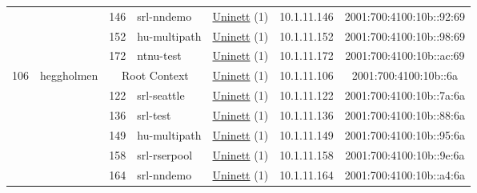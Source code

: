 \begin{small}
\begin{center}
\begin{longtable}{|c|c|c|c|c|c|c|c|}
  &  & \tiny{146} & \multicolumn{1}{|l|}{\tiny{srl-nndemo}} & \multicolumn{2}{|c|}{\tiny{\href{https://www.uninett.no}{Uninett} (1)}} & \tiny{10.1.11.146} & \tiny{2001:700:4100:10b::92:69} \\* \cline{3-3}\cline{4-4}\cline{5-5}\cline{6-6}\cline{7-7}\cline{8-8}
  &  & \tiny{152} & \multicolumn{1}{|l|}{\tiny{hu-multipath}} & \multicolumn{2}{|c|}{\tiny{\href{https://www.uninett.no}{Uninett} (1)}} & \tiny{10.1.11.152} & \tiny{2001:700:4100:10b::98:69} \\* \cline{3-3}\cline{4-4}\cline{5-5}\cline{6-6}\cline{7-7}\cline{8-8}
  &  & \tiny{172} & \multicolumn{1}{|l|}{\tiny{ntnu-test}} & \multicolumn{2}{|c|}{\tiny{\href{https://www.uninett.no}{Uninett} (1)}} & \tiny{10.1.11.172} & \tiny{2001:700:4100:10b::ac:69} \\ \hline
 \multirow{7}{*}{\tiny{106}} & \multicolumn{1}{|l|}{\multirow{7}{*}{\tiny{heggholmen}}} & \multicolumn{2}{|c|}{\tiny{Root Context}} & \multicolumn{2}{|c|}{\tiny{\href{https://www.uninett.no}{Uninett} (1)}} & \tiny{10.1.11.106} & \tiny{2001:700:4100:10b::6a} \\* \cline{3-3}\cline{4-4}\cline{5-5}\cline{6-6}\cline{7-7}\cline{8-8}
  &  & \tiny{122} & \multicolumn{1}{|l|}{\tiny{srl-seattle}} & \multicolumn{2}{|c|}{\tiny{\href{https://www.uninett.no}{Uninett} (1)}} & \tiny{10.1.11.122} & \tiny{2001:700:4100:10b::7a:6a} \\* \cline{3-3}\cline{4-4}\cline{5-5}\cline{6-6}\cline{7-7}\cline{8-8}
  &  & \tiny{136} & \multicolumn{1}{|l|}{\tiny{srl-test}} & \multicolumn{2}{|c|}{\tiny{\href{https://www.uninett.no}{Uninett} (1)}} & \tiny{10.1.11.136} & \tiny{2001:700:4100:10b::88:6a} \\* \cline{3-3}\cline{4-4}\cline{5-5}\cline{6-6}\cline{7-7}\cline{8-8}
  &  & \tiny{149} & \multicolumn{1}{|l|}{\tiny{hu-multipath}} & \multicolumn{2}{|c|}{\tiny{\href{https://www.uninett.no}{Uninett} (1)}} & \tiny{10.1.11.149} & \tiny{2001:700:4100:10b::95:6a} \\* \cline{3-3}\cline{4-4}\cline{5-5}\cline{6-6}\cline{7-7}\cline{8-8}
  &  & \tiny{158} & \multicolumn{1}{|l|}{\tiny{srl-rserpool}} & \multicolumn{2}{|c|}{\tiny{\href{https://www.uninett.no}{Uninett} (1)}} & \tiny{10.1.11.158} & \tiny{2001:700:4100:10b::9e:6a} \\* \cline{3-3}\cline{4-4}\cline{5-5}\cline{6-6}\cline{7-7}\cline{8-8}
  &  & \tiny{164} & \multicolumn{1}{|l|}{\tiny{srl-nndemo}} & \multicolumn{2}{|c|}{\tiny{\href{https://www.uninett.no}{Uninett} (1)}} & \tiny{10.1.11.164} & \tiny{2001:700:4100:10b::a4:6a} \\* \cline{3-3}\cline{4-4}\cline{5-5}\cline{6-6}\cline{7-7}\cline{8-8}

\end{longtable}
\end{center}
\end{small}
